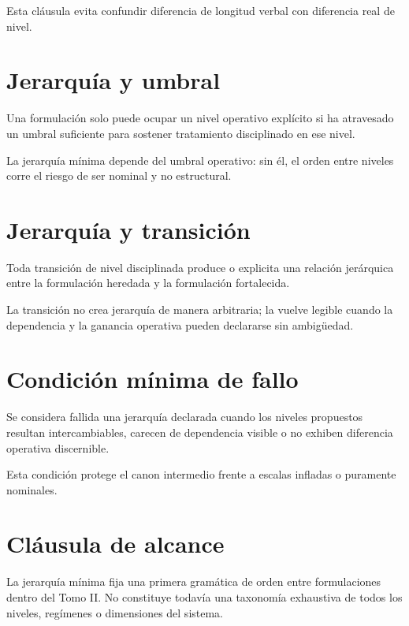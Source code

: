 \begin{observation}
Esta cláusula evita confundir diferencia de longitud verbal con diferencia real de nivel.
\end{observation}

\section{Jerarquía y umbral}
\begin{definition}
Una formulación solo puede ocupar un nivel operativo explícito si ha atravesado un umbral suficiente para sostener tratamiento disciplinado en ese nivel.
\end{definition}

\begin{observation}
La jerarquía mínima depende del umbral operativo: sin él, el orden entre niveles corre el riesgo de ser nominal y no estructural.
\end{observation}

\section{Jerarquía y transición}
\begin{definition}
Toda transición de nivel disciplinada produce o explicita una relación jerárquica entre la formulación heredada y la formulación fortalecida.
\end{definition}

\begin{observation}
La transición no crea jerarquía de manera arbitraria; la vuelve legible cuando la dependencia y la ganancia operativa pueden declararse sin ambigüedad.
\end{observation}

\section{Condición mínima de fallo}
\begin{definition}
Se considera fallida una jerarquía declarada cuando los niveles propuestos resultan intercambiables, carecen de dependencia visible o no exhiben diferencia operativa discernible.
\end{definition}

\begin{observation}
Esta condición protege el canon intermedio frente a escalas infladas o puramente nominales.
\end{observation}

\section{Cláusula de alcance}
\begin{observation}
La jerarquía mínima fija una primera gramática de orden entre formulaciones dentro del Tomo II. No constituye todavía una taxonomía exhaustiva de todos los niveles, regímenes o dimensiones del sistema.
\end{observation}

